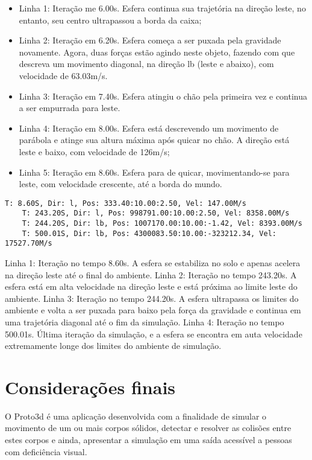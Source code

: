 \documentclass[12pt]{article}
\begin{document}
\begin{itemize}
	\item Linha 1: Iteração me 6.00s. Esfera continua sua trajetória na direção leste, no entanto, seu centro ultrapassou a borda da caixa;
	
	\item Linha 2: Iteração em 6.20s. Esfera começa a ser puxada pela gravidade novamente. Agora, duas forças estão agindo neste objeto, fazendo com que descreva um movimento diagonal, na direção lb (leste e abaixo), com velocidade de 63.03m/s.
	
	\item Linha 3: Iteração em 7.40s. Esfera atingiu o chão pela primeira vez e continua a ser empurrada para leste.
	
	\item Linha 4: Iteração em 8.00s. Esfera está descrevendo um movimento de parábola e atinge sua altura máxima após quicar no chão. A direção está leste e baixo, com velocidade de 126m/s;
	
	\item Linha 5: Iteração em 8.60s. Esfera para de quicar, movimentando-se para leste, com velocidade crescente, até a borda do mundo.
\end{itemize}

\begin{lstlisting}[frame=single,caption=Esfera sobre o chão e saída do ambiente\label{lg:esferaM4}]
	T: 8.60S, Dir: l, Pos: 333.40:10.00:2.50, Vel: 147.00M/s
	T: 243.20S, Dir: l, Pos: 998791.00:10.00:2.50, Vel: 8358.00M/s
	T: 244.20S, Dir: lb, Pos: 1007170.00:10.00:-1.42, Vel: 8393.00M/s
	T: 500.01S, Dir: lb, Pos: 4300083.50:10.00:-323212.34, Vel: 17527.70M/s
\end{lstlisting}

Linha 1: Iteração no tempo 8.60s. A esfera se estabiliza no solo e apenas acelera na direção leste até o final do ambiente.
Linha 2: Iteração no tempo 243.20s. A esfera está em alta velocidade na direção leste e está próxima ao limite leste do ambiente.
Linha 3: Iteração no tempo 244.20s. A esfera ultrapassa os limites do ambiente e volta a ser puxada para baixo pela força da gravidade e continua em uma trajetória diagonal até o fim da simulação.
Linha 4: Iteração no tempo 500.01s. Última iteração da simulação, e a esfera se encontra em auta velocidade extremamente longe dos limites do ambiente de simulação.

\section{Considerações finais}
O Proto3d é uma aplicação desenvolvida com a finalidade de simular o movimento de um ou mais corpos sólidos, detectar e resolver as colisões entre estes corpos e ainda, apresentar a simulação em uma saída acessível a pessoas com deficiência visual.
\end{document}

